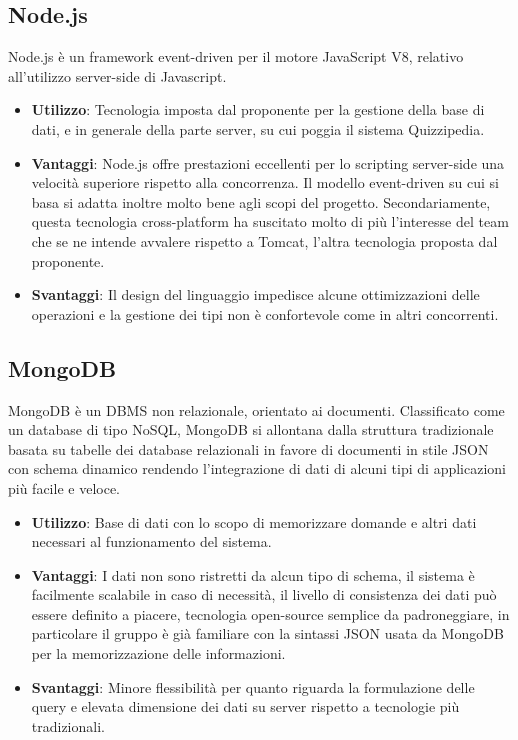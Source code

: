 	\subsection{Node.js}
	 Node.js è un framework event-driven per il motore JavaScript V8, relativo all'utilizzo server-side di Javascript.
	\begin{itemize}
		\item\textbf{Utilizzo}: Tecnologia imposta dal proponente per la gestione della base di dati, e in generale della parte server, su cui poggia il sistema Quizzipedia.
		\item\textbf{Vantaggi}: Node.js offre prestazioni eccellenti per lo scripting server-side una velocità superiore rispetto alla concorrenza. Il modello event-driven su cui si basa si adatta inoltre molto bene agli scopi del progetto. Secondariamente, questa tecnologia cross-platform ha suscitato molto di più l'interesse del team che se ne intende avvalere rispetto a Tomcat, l'altra tecnologia proposta dal proponente.
		\item\textbf{Svantaggi}: Il design del linguaggio impedisce alcune ottimizzazioni delle operazioni e la gestione dei tipi non è confortevole come in altri concorrenti.
	\end{itemize}
	\subsection{MongoDB}
	MongoDB è un DBMS non relazionale, orientato ai documenti. Classificato come un database di tipo NoSQL, MongoDB si allontana dalla struttura tradizionale basata su tabelle dei database relazionali in favore di documenti in stile JSON con schema dinamico rendendo l'integrazione di dati di alcuni tipi di applicazioni più facile e veloce.
	\begin{itemize}
		\item\textbf{Utilizzo}: Base di dati con lo scopo di memorizzare domande e altri dati necessari al funzionamento del sistema.
		\item\textbf{Vantaggi}: I dati non sono ristretti da alcun tipo di schema, il sistema è facilmente scalabile in caso di necessità, il livello di consistenza dei dati può essere definito a piacere, tecnologia open-source semplice da padroneggiare, in particolare il gruppo è già familiare con la sintassi JSON usata da MongoDB per la memorizzazione delle informazioni.
		\item\textbf{Svantaggi}: Minore flessibilità per quanto riguarda la formulazione delle query e elevata dimensione dei dati su server rispetto a tecnologie più tradizionali.
	\end{itemize}
